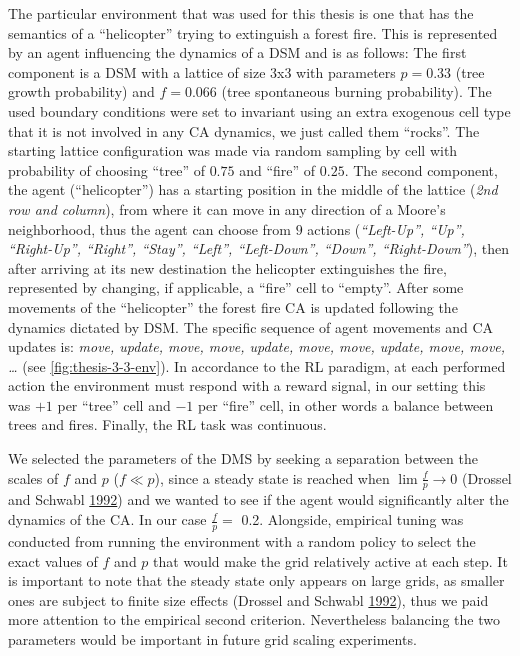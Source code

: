 \documentclass[
  12pt,
  openany]{book}
\begin{document}
The particular environment that was used for this thesis is one that has the semantics of a ``helicopter'' trying to extinguish a forest fire. This is represented by an agent influencing the dynamics of a DSM and is as follows: The first component is a DSM with a lattice of size 3x3 with parameters \(p=0.33\) (tree growth probability) and \(f=0.066\) (tree spontaneous burning probability). The used boundary conditions were set to invariant using an extra exogenous cell type that it is not involved in any CA dynamics, we just called them ``rocks''. The starting lattice configuration was made via random sampling by cell with probability of choosing ``tree'' of \(0.75\) and ``fire'' of \(0.25\). The second component, the agent (``helicopter'') has a starting position in the middle of the lattice (\emph{2nd row and column}), from where it can move in any direction of a Moore's neighborhood, thus the agent can choose from \(9\) actions (\emph{``Left-Up'', ``Up'', ``Right-Up'', ``Right'', ``Stay'', ``Left'', ``Left-Down'', ``Down'', ``Right-Down''}), then after arriving at its new destination the helicopter extinguishes the fire, represented by changing, if applicable, a ``fire'' cell to ``empty''. After some movements of the ``helicopter'' the forest fire CA is updated following the dynamics dictated by DSM. The specific sequence of agent movements and CA updates is: \emph{move, update, move, move, update, move, move, update, move, move, \ldots{}} (see \ref{fig:thesis-3-3-env}). In accordance to the RL paradigm, at each performed action the environment must respond with a reward signal, in our setting this was \(+1\) per ``tree'' cell and \(-1\) per ``fire'' cell, in other words a balance between trees and fires. Finally, the RL task was continuous.

We selected the parameters of the DMS by seeking a separation between the scales of \(f\) and \(p\) (\(f \ll p\)), since a steady state is reached when \(\lim \frac {f}{p} \to 0\) (Drossel and Schwabl \protect\hyperlink{ref-drossel1992self}{1992}) and we wanted to see if the agent would significantly alter the dynamics of the CA. In our case \(\frac {f}{p}=\) 0.2. Alongside, empirical tuning was conducted from running the environment with a random policy to select the exact values of \(f\) and \(p\) that would make the grid relatively active at each step. It is important to note that the steady state only appears on large grids, as smaller ones are subject to finite size effects (Drossel and Schwabl \protect\hyperlink{ref-drossel1992self}{1992}), thus we paid more attention to the empirical second criterion. Nevertheless balancing the two parameters would be important in future grid scaling experiments.
\end{document}
